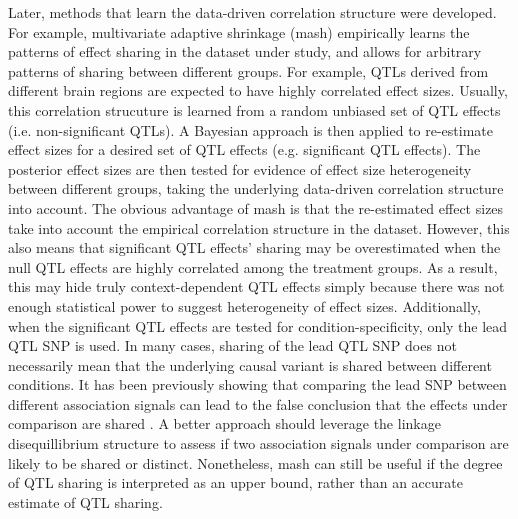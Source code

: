 Later, methods that learn the data-driven correlation structure were developed. For example, multivariate adaptive shrinkage (mash) empirically learns the patterns of effect sharing in the dataset under study, and allows for arbitrary patterns of sharing between different groups. For example, QTLs derived from different brain regions are expected to have highly correlated effect sizes. Usually, this correlation strucuture is learned from a random unbiased set of QTL effects (i.e. non-significant QTLs). A Bayesian approach is then applied to re-estimate effect sizes for a desired set of QTL effects (e.g. significant QTL effects). The posterior effect sizes are then tested for evidence of effect size heterogeneity between different groups, taking the underlying data-driven correlation structure into account. The obvious advantage of mash is that the re-estimated effect sizes take into account the empirical correlation structure in the dataset. However, this also means that significant QTL effects' sharing may be overestimated when the null QTL effects are highly correlated among the treatment groups. As a result, this may hide truly context-dependent QTL effects simply because there was not enough statistical power to suggest heterogeneity of effect sizes. Additionally, when the significant QTL effects are tested for condition-specificity, only the lead QTL SNP is used. In many cases, sharing of the lead QTL SNP does not necessarily mean that the underlying causal variant is shared between different conditions. It has been previously showing that comparing the lead SNP between different association signals can lead to the false conclusion that the effects under comparison are shared \cite{Liu2019-fv}. A better approach should leverage the linkage disequillibrium structure to assess if two association signals under comparison are likely to be shared or distinct. Nonetheless, mash can still be useful if the degree of QTL sharing is interpreted as an upper bound, rather than an accurate estimate of QTL sharing.\\


